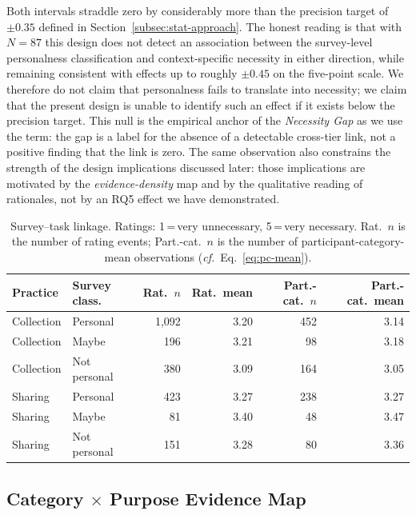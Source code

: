 \documentclass[11pt,a4paper]{article}
\begin{document}
Both intervals straddle zero by considerably more than the precision
target of $\pm 0.35$ defined in Section~\ref{subsec:stat-approach}.
The honest reading is that with $N=87$ this design does not detect an
association between the survey-level personalness classification and
context-specific necessity in either direction, while remaining
consistent with effects up to roughly $\pm 0.45$ on the five-point
scale. We therefore do not claim that personalness fails to translate
into necessity; we claim that the present design is unable to identify
such an effect if it exists below the precision target. This null is
the empirical anchor of the \emph{Necessity Gap} as we use the term:
the gap is a label for the absence of a detectable cross-tier link,
not a positive finding that the link is zero. The same observation
also constrains the strength of the design implications discussed
later: those implications are motivated by the
\emph{evidence-density} map and by the qualitative reading of
rationales, not by an RQ5 effect we have demonstrated.

\begin{table}[t]
\centering
\caption{Survey--task linkage. Ratings: 1\,=\,very unnecessary,
5\,=\,very necessary. Rat.~$n$ is the number of rating events;
Part.-cat.~$n$ is the number of participant-category-mean observations
(\textit{cf.}\ Eq.~\ref{eq:pc-mean}).}
\label{tab:rq5-linkage}
\small
\begin{tabular}{llrrrr}
\toprule
\textbf{Practice} & \textbf{Survey class.} & \textbf{Rat.\ $n$} &
\textbf{Rat.\ mean} & \textbf{Part.-cat.\ $n$} & \textbf{Part.-cat.\ mean} \\
\midrule
Collection & Personal      & 1{,}092 & 3.20 & 452 & 3.14 \\
Collection & Maybe         &    196  & 3.21 &  98 & 3.18 \\
Collection & Not personal  &    380  & 3.09 & 164 & 3.05 \\
Sharing    & Personal      &    423  & 3.27 & 238 & 3.27 \\
Sharing    & Maybe         &     81  & 3.40 &  48 & 3.47 \\
Sharing    & Not personal  &    151  & 3.28 &  80 & 3.36 \\
\bottomrule
\end{tabular}
\end{table}

\subsection{Category $\times$ Purpose Evidence Map}
\label{subsec:cat-purpose-map}
\end{document}
